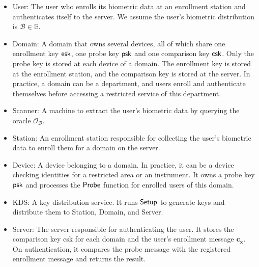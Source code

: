 \begin{itemize}

	\item {\sf User}: The user who enrolls its biometric data at an enrollment station and authenticates itself to the server. We assume the user's biometric distribution is $\mathcal{B} \in \mathbb{B}$.
	
	\item {\sf Domain}: A domain that owns several devices, all of which share one enrollment key ${\sf esk}$, one probe key ${\sf psk}$ and one comparison key ${\sf csk}$. Only the probe key is stored at each device of a domain. The enrollment key is stored at the enrollment station, and the comparison key is stored at the server. In practice, a domain can be a department, and users enroll and authenticate themselves before accessing a restricted service of this department.

	\item {\sf Scanner}: A machine to extract the user's biometric data by querying the oracle $\mathcal{O}_{\mathcal{B}}$.
	
	\item {\sf Station}: An enrollment station responsible for collecting the user's biometric data to enroll them for a domain on the server.

	\item {\sf Device}: A device belonging to a domain. In practice, it can be a device checking identities for a restricted area or an instrument. It owns a probe key $\sf psk$ and processes the $\sf Probe$ function for enrolled users of this domain.
	
	\item {\sf KDS}: A key distribution service. It runs ${\sf Setup}$ to generate keys and distribute them to {\sf Station}, {\sf Domain}, and {\sf Server}.
		
	\item {\sf Server}: The server responsible for authenticating the user. It stores the comparison key {\sf csk} for each domain and the user's enrollment message $\mathbf{c_x}$. On authentication, it compares the probe message with the registered enrollment message and returns the result.  

\end{itemize}





\pagebreak



